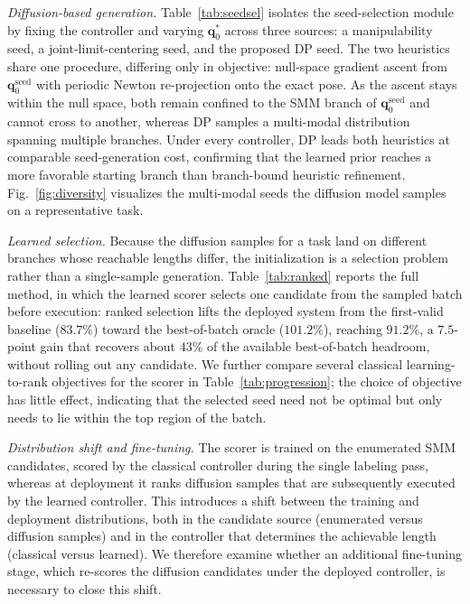 \documentclass[journal, twoside]{IEEEtran}
\begin{document}
\emph{Diffusion-based generation.}
Table~\ref{tab:seedsel} isolates the seed-selection module by fixing the controller and varying $\mathbf{q}_{0}^{*}$ across three sources: a manipulability seed, a joint-limit-centering seed, and the proposed DP seed. The two heuristics share one procedure, differing only in objective: null-space gradient ascent from $\mathbf{q}_{0}^{\mathrm{seed}}$ with periodic Newton re-projection onto the exact pose. As the ascent stays within the null space, both remain confined to the SMM branch of $\mathbf{q}_{0}^{\mathrm{seed}}$ and cannot cross to another, whereas DP samples a multi-modal distribution spanning multiple branches. Under every controller, DP leads both heuristics at comparable seed-generation cost, confirming that the learned prior reaches a more favorable starting branch than branch-bound heuristic refinement. Fig.~\ref{fig:diversity} visualizes the multi-modal seeds the diffusion model samples on a representative task.

\emph{Learned selection.} Because the diffusion samples for a task land on different branches whose reachable lengths differ, the initialization is a selection problem rather than a single-sample generation. Table~\ref{tab:ranked} reports the full method, in which the learned scorer selects one candidate from the sampled batch before execution: ranked selection lifts the deployed system from the first-valid baseline ($83.7\%$) toward the best-of-batch oracle ($101.2\%$), reaching $91.2\%$, a $7.5$-point gain that recovers about $43\%$ of the available best-of-batch headroom, without rolling out any candidate. We further compare several classical learning-to-rank objectives for the scorer in Table~\ref{tab:progression}; the choice of objective has little effect, indicating that the selected seed need not be optimal but only needs to lie within the top region of the batch.

\emph{Distribution shift and fine-tuning.} The scorer is trained on the enumerated SMM candidates, scored by the classical controller during the single labeling pass, whereas at deployment it ranks diffusion samples that are subsequently executed by the learned controller. This introduces a shift between the training and deployment distributions, both in the candidate source (enumerated versus diffusion samples) and in the controller that determines the achievable length (classical versus learned). We therefore examine whether an additional fine-tuning stage, which re-scores the diffusion candidates under the deployed controller, is necessary to close this shift.
\end{document}
